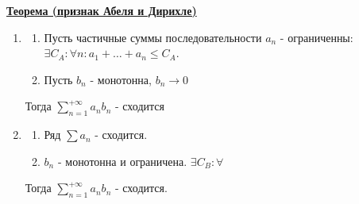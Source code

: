 \documentclass{article}
\newcommand{\thmm}[1]{\underline{\textbf{#1}}}
\begin{document}
\thmm{Теорема (признак Абеля и Дирихле)}

\begin{enumerate}
    \item
    \begin{enumerate}
        \item  Пусть частичные суммы последовательности $a_n$ - ограниченны: $\exists C_A: \forall n: a_1 + \ldots + a_n \leq C_A$.
         \item Пусть $b_n$ - монотонна, $b_n\rightarrow 0 $
    
    \end{enumerate}
     Тогда $\sum\limits_{n=1}^{+\infty}a_nb_n$ - сходится
  
   \item
   \begin{enumerate}
       \item Ряд $\sum a_n$ - сходится.
        \item $b_n$ - монотонна и ограничена. $\exists C_B: \forall $
   \end{enumerate}
    Тогда $\sum\limits_{n=1}^{+\infty}a_nb_n$ - сходится.
   
\end{enumerate}
\end{document}

